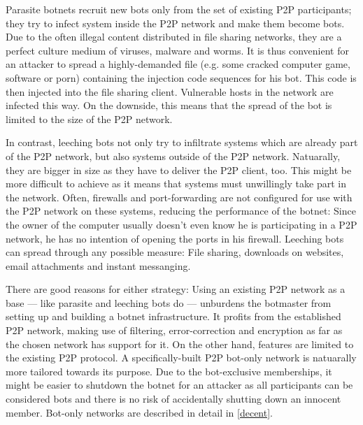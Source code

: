 \documentclass{llncs}
\begin{document}
Parasite botnets recruit new bots only from the set of existing P2P
participants; they try to infect system inside the P2P network and
make them become bots. Due to the often illegal content distributed in
file sharing networks, they are a perfect culture medium of viruses,
malware and worms. It is thus convenient for an attacker to spread a
highly-demanded file (e.g. some cracked computer game, software or
porn) containing the injection code sequences for his bot. This code is
then injected into the file sharing client. Vulnerable hosts in the
network are infected this way. On the downside, this means that the
spread of the bot is limited to the size of the P2P network.

In contrast, leeching bots not only try to infiltrate systems which
are already part of the P2P network, but also systems outside of the
P2P network. Natuarally, they are bigger in size as they have to
deliver the P2P client, too. This might be more difficult to achieve
as it means that systems must unwillingly take part in the
network. Often, firewalls and port-forwarding are not configured for
use with the P2P network on these systems, reducing the performance of
the botnet: Since the owner of the computer usually doesn't even know
he is participating in a P2P network, he has no intention of opening
the ports in his firewall. Leeching bots can spread through any
possible measure: File sharing, downloads on websites, email
attachments and instant messanging.

There are good reasons for either strategy: Using an existing P2P
network as a base --- like parasite and leeching bots do --- unburdens
the botmaster from setting up and building a botnet infrastructure. It
profits from the established P2P network, making use of filtering,
error-correction and encryption as far as the chosen network has
support for it. On the other hand, features are limited to the
existing P2P protocol. A specifically-built P2P bot-only network is
natuarally more tailored towards its purpose. Due to the bot-exclusive
memberships, it might be easier to shutdown the botnet for an attacker
as all participants can be considered bots and there is no risk of
accidentally shutting down an innocent member. Bot-only networks are
described in detail in \ref{decent}.
\end{document}
